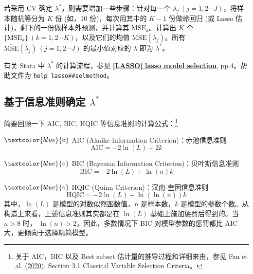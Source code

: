 若采用 CV 确定 $\lambda^*$，则需要增加一些步骤：针对每一个 $\lambda_j\ (j=1,2\cdots J)$，将样本随机等分为 $K$ 份 (如，10 份)，每次用其中的 $K-1$ 份做岭回归 (或 Lasso 估计)，剩下的一份做样本外预测，并计算其 $\mathrm{MSE}_k$。计算出 $K$ 个 $\{\mathrm{MSE}_k\}\ (k=1,2\cdots K)$，以及它们的均值 $\overline{\mathrm{MSE}}(\lambda_j)$。所有 $\overline{\mathrm{MSE}}(\lambda_j)\ (j=1,2\cdots J)$ 的最小值对应的 $\lambda$ 即为 $\lambda^*$。

有关 Stata 中 $\lambda^*$ 的计算流程，参见 \href{https://www.stata.com/manuals/lassolasso.pdf}{\bfseries{[\MakeUppercase{lasso}] lasso model selection}}, pp.4。帮助文件为 \texttt{help lasso\#\#selmethod}。



\subsection{基于信息准则确定 $\lambda^*$}\label{sec:lasso-lambda-ic}

简要回顾一下 AIC, BIC, HQIC 等信息准则的计算公式：\footnote{%
   关于 AIC，BIC 以及 Best subset 估计量的推导过程和详细来由，参见 Fan et al. (\href{https://www.taylorfrancis.com/books/mono/10.1201/9780429096280/statistical-foundations-data-science-jianqing-fan-runze-li-cun-hui-zhang-hui-zou}{2020}), Section 3.1 Classical Variable Selection Criteria。%
}

$\textcolor{blue}{\circ}$ AIC (Akaike Information Criterion)：赤池信息准则
$$\mathrm{AIC} = -2 \ln(L) + 2 k$$

$\textcolor{blue}{\circ}$ BIC (Bayesian Information Criterion)：贝叶斯信息准则
$$\mathrm{BIC}=-2 \ln(L) + \ln(n)k$$

$\textcolor{blue}{\circ}$ HQIC (Quinn Criterion)：汉南-奎因信息准则
$$\mathrm{HQIC}=-2 \ln(L) + \ln(\ln(n))k$$
其中，$\ln(L)$ 是模型的对数似然函数值，$n$ 是样本数，$k$ 是模型的参数个数。从构造上来看，上述信息准则其实都是在 $\ln(L)$ 基础上施加惩罚后得到的。当 $n>8$ 时， $\ln(n)>2$，因此，多数情况下 BIC 对模型参数的惩罚都比 AIC 大，更倾向于选择精简模型。


